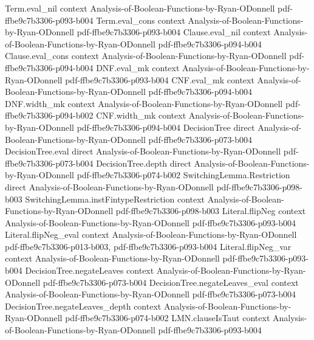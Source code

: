 \begin{theorem}
\proofstep
  {Term.eval_nil}
  {context}
  {Analysis-of-Boolean-Functions-by-Ryan-ODonnell}
  {pdf-ffbe9c7b3306-p093-b004}
\proofstep
  {Term.eval_cons}
  {context}
  {Analysis-of-Boolean-Functions-by-Ryan-ODonnell}
  {pdf-ffbe9c7b3306-p093-b004}
\proofstep
  {Clause.eval_nil}
  {context}
  {Analysis-of-Boolean-Functions-by-Ryan-ODonnell}
  {pdf-ffbe9c7b3306-p094-b004}
\proofstep
  {Clause.eval_cons}
  {context}
  {Analysis-of-Boolean-Functions-by-Ryan-ODonnell}
  {pdf-ffbe9c7b3306-p094-b004}
\proofstep
  {DNF.eval_mk}
  {context}
  {Analysis-of-Boolean-Functions-by-Ryan-ODonnell}
  {pdf-ffbe9c7b3306-p093-b004}
\proofstep
  {CNF.eval_mk}
  {context}
  {Analysis-of-Boolean-Functions-by-Ryan-ODonnell}
  {pdf-ffbe9c7b3306-p094-b004}
\proofstep
  {DNF.width_mk}
  {context}
  {Analysis-of-Boolean-Functions-by-Ryan-ODonnell}
  {pdf-ffbe9c7b3306-p094-b002}
\proofstep
  {CNF.width_mk}
  {context}
  {Analysis-of-Boolean-Functions-by-Ryan-ODonnell}
  {pdf-ffbe9c7b3306-p094-b004}
\proofstep
  {DecisionTree}
  {direct}
  {Analysis-of-Boolean-Functions-by-Ryan-ODonnell}
  {pdf-ffbe9c7b3306-p073-b004}
\proofstep
  {DecisionTree.eval}
  {direct}
  {Analysis-of-Boolean-Functions-by-Ryan-ODonnell}
  {pdf-ffbe9c7b3306-p073-b004}
\proofstep
  {DecisionTree.depth}
  {direct}
  {Analysis-of-Boolean-Functions-by-Ryan-ODonnell}
  {pdf-ffbe9c7b3306-p074-b002}
\proofstep
  {SwitchingLemma.Restriction}
  {direct}
  {Analysis-of-Boolean-Functions-by-Ryan-ODonnell}
  {pdf-ffbe9c7b3306-p098-b003}
\proofstep
  {SwitchingLemma.instFintypeRestriction}
  {context}
  {Analysis-of-Boolean-Functions-by-Ryan-ODonnell}
  {pdf-ffbe9c7b3306-p098-b003}
\proofstep
  {Literal.flipNeg}
  {context}
  {Analysis-of-Boolean-Functions-by-Ryan-ODonnell}
  {pdf-ffbe9c7b3306-p093-b004}
\proofstep
  {Literal.flipNeg_eval}
  {context}
  {Analysis-of-Boolean-Functions-by-Ryan-ODonnell}
  {pdf-ffbe9c7b3306-p013-b003,
    pdf-ffbe9c7b3306-p093-b004}
\proofstep
  {Literal.flipNeg_var}
  {context}
  {Analysis-of-Boolean-Functions-by-Ryan-ODonnell}
  {pdf-ffbe9c7b3306-p093-b004}
\proofstep
  {DecisionTree.negateLeaves}
  {context}
  {Analysis-of-Boolean-Functions-by-Ryan-ODonnell}
  {pdf-ffbe9c7b3306-p073-b004}
\proofstep
  {DecisionTree.negateLeaves_eval}
  {context}
  {Analysis-of-Boolean-Functions-by-Ryan-ODonnell}
  {pdf-ffbe9c7b3306-p073-b004}
\proofstep
  {DecisionTree.negateLeaves_depth}
  {context}
  {Analysis-of-Boolean-Functions-by-Ryan-ODonnell}
  {pdf-ffbe9c7b3306-p074-b002}
\proofstep
  {LMN.clauseIsTaut}
  {context}
  {Analysis-of-Boolean-Functions-by-Ryan-ODonnell}
  {pdf-ffbe9c7b3306-p093-b004}
\proofstep

\end{theorem}
